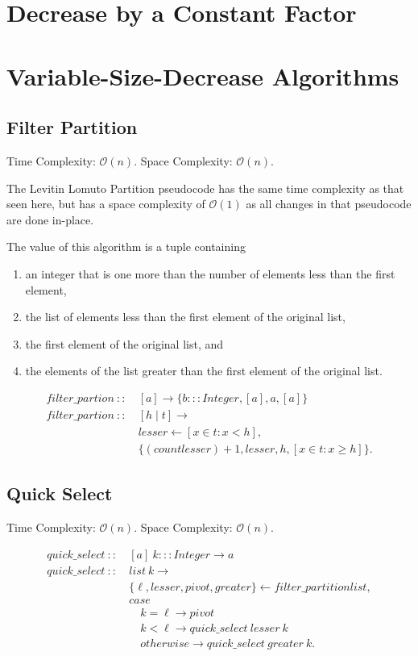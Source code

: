 \documentclass[a4paper,10pt]{book}
\begin{document}
\section{Decrease by a Constant Factor}

\section{Variable-Size-Decrease Algorithms}
\subsection{Filter Partition} Time Complexity: $\mathcal{O}(n)$. Space Complexity: $\mathcal{O}(n)$.

The Levitin Lomuto Partition pseudocode has the same time complexity as that seen here, but has a space complexity of $\mathcal{O}(1)$ as all changes in that pseudocode are done in-place.

The value of this algorithm is a tuple containing
\begin{enumerate} 
\item an integer that is one more than the number of elements less than the first element, 
\item the list of elements less than the first element of the original list,
\item the first element of the original list, and 
\item the elements of the list greater than the first element of the original list.
\end{enumerate}

\begin{align*}
filter\_partion\ ::\ &[a]\rightarrow \{b:::Integer,[a],a,[a]\}\\
filter\_partion\ ::\ &[h\mid t]\rightarrow\\
	&lesser\leftarrow [x\in t : x<h],\\
	&\{(count lesser)+1,lesser,h,[x\in t : x\ge h]\}.
\end{align*}

\subsection{Quick Select} Time Complexity: $\mathcal{O}(n)$. Space Complexity: $\mathcal{O}(n)$.

\begin{align*}
quick\_select\ ::\ &[a]\ k:::Integer\rightarrow a\\
quick\_select\ ::\ &list\ k\rightarrow\\
	&\{\ell,lesser,pivot,greater\}\leftarrow filter\_partition list,\\
	&case\\
	&\quad k=\ell\rightarrow pivot\\
	&\quad k<\ell\rightarrow quick\_select\ lesser\ k\\
	&\quad otherwise\rightarrow quick\_select\ greater\ k.
\end{align*}
\end{document}
